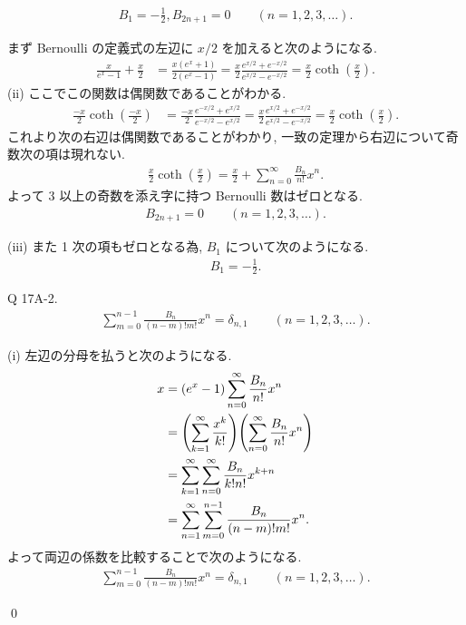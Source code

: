 \documentclass[uplatex,dvipdfmx,a4paper,11pt]{jlreq}
\makeatletter
\theoremstyle{definition}
\renewenvironment{proof}[1][\proofname]{\par
  \normalfont
  \topsep6\p@\@plus6\p@ \trivlist
  \item[\hskip\labelsep{\bfseries #1}\@addpunct{\bfseries}]\ignorespaces\quad\par
}{%
  \qed\endtrivlist\@endpefalse
}
\renewcommand\proofname{証明}
\makeatother
\begin{document}
\begin{theorem}
  \begin{align}
    B_1 = -\frac{1}{2}, B_{2n+1} = 0 \qquad (n = 1,2,3,\ldots).
  \end{align}
\end{theorem}
\begin{proof}
  まず Bernoulli の定義式の左辺に $x/2$ を加えると次のようになる.
  \begin{align}
    \frac{x}{e^x - 1} + \frac{x}{2} & = \frac{x(e^x + 1)}{2(e^x - 1)} = \frac{x}{2}\frac{e^{x/2} + e^{-x/2}}{e^{x/2} - e^{-x/2}} = \frac{x}{2}\coth(\frac{x}{2}).
  \end{align}
  (ii) ここでこの関数は偶関数であることがわかる.
  \begin{align}
    \frac{-x}{2}\coth(\frac{-x}{2}) & = \frac{-x}{2}\frac{e^{-x/2} + e^{x/2}}{e^{-x/2} - e^{x/2}} = \frac{x}{2}\frac{e^{x/2} + e^{-x/2}}{e^{x/2} - e^{-x/2}} = \frac{x}{2}\coth(\frac{x}{2}).
  \end{align}
  これより次の右辺は偶関数であることがわかり, 一致の定理から右辺について奇数次の項は現れない.
  \begin{align}
    \frac{x}{2}\coth(\frac{x}{2}) = \frac{x}{2} + \sum_{n=0}^{\infty}\frac{B_n}{n!}x^n.
  \end{align}
  よって 3 以上の奇数を添え字に持つ Bernoulli 数はゼロとなる.
  \begin{align}
    B_{2n+1} = 0 \qquad (n = 1,2,3,\ldots).
  \end{align}

  (iii) また 1 次の項もゼロとなる為, $B_1$ について次のようになる.
  \begin{align}
    B_1 = -\frac{1}{2}.
  \end{align}

  \begin{itembox}[l]{Q 17A-2.}
    \begin{align}
      \sum_{m=0}^{n-1}\frac{B_n}{(n - m)!m!}x^n = \delta_{n,1} \qquad (n = 1,2,3,\ldots).
    \end{align}
  \end{itembox}

  (i)
  左辺の分母を払うと次のようになる.
  \begin{align}
    x & = (e^x - 1)\sum_{n=0}^{\infty}\frac{B_n}{n!}x^n                                     \\
      & = \qty(\sum_{k=1}^{\infty}\frac{x^k}{k!})\qty(\sum_{n=0}^{\infty}\frac{B_n}{n!}x^n) \\
      & = \sum_{k=1}^{\infty}\sum_{n=0}^{\infty}\frac{B_n}{k!n!}x^{k+n}                     \\
      & = \sum_{n=1}^{\infty}\sum_{m=0}^{n-1}\frac{B_n}{(n - m)!m!}x^n.
  \end{align}
  よって両辺の係数を比較することで次のようになる.
  \begin{align}
    \sum_{m=0}^{n-1}\frac{B_n}{(n - m)!m!}x^n = \delta_{n,1} \qquad (n = 1,2,3,\ldots).
  \end{align}


\end{proof}
\end{document}
